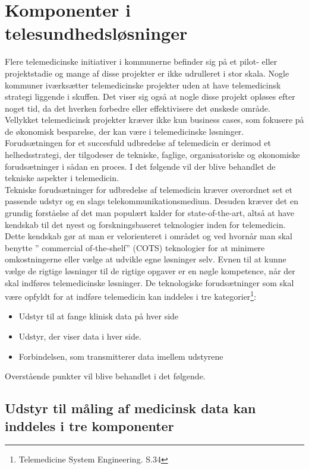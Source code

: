 \section{Komponenter i telesundhedsløsninger}
Flere telemedicinske initiativer i kommunerne befinder sig på et pilot- eller projektstadie og mange af disse projekter er ikke udrulleret i stor skala. Nogle kommuner iværksætter telemedicinske projekter uden at have telemedicinsk strategi liggende i skuffen. Det viser sig også at nogle disse projekt opløses efter noget tid, da det hverken forbedre eller effektivisere det ønskede område. Vellykket telemedicinsk projekter kræver ikke kun business cases, som fokusere på de økonomisk besparelse, der kan være i telemedicinske løsninger. Forudsætningen for et succesfuld udbredelse af telemedicin er derimod et helhedsstrategi, der tilgodeser de tekniske, faglige, organisatoriske og økonomiske forudsætninger i sådan en proces. I det følgende vil der blive behandlet de tekniske aspekter i telemedicin.\\
Tekniske forudsætninger for udbredelse af telemedicin kræver overordnet set et passende udstyr og en slags telekommunikationsmedium. Desuden kræver det en grundig forståelse af det man populært kalder for state-of-the-art, altså at have kendskab til det nyest og forskningsbaseret teknologier inden for telemedicin. Dette kendskab gør at man er velorienteret i området og ved hvornår man skal benytte ” commercial of-the-shelf” (COTS) teknologier for at minimere omkostningerne eller vælge at udvikle egne løsninger selv. Evnen til at kunne vælge de rigtige løsninger til de rigtige opgaver er en nøgle kompetence, når der skal indføres telemedicinske løsninger. De teknologiske forudsætninger som skal være opfyldt for at indføre telemedicin kan inddeles i tre kategorier\footnote{Telemedicine System Engineering. S.34}:
\begin{itemize}
\item Udstyr til at fange klinisk data på hver side
\item Udstyr, der viser data i hver side. 
\item Forbindelsen, som transmitterer data imellem udstyrene
\end{itemize}

Overstående punkter vil blive behandlet i det følgende.

\subsection{Udstyr til måling af medicinsk data kan inddeles i tre komponenter}


